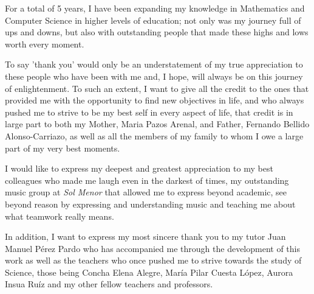 For a total of 5 years, I have been expanding my knowledge in Mathematics and Computer Science in higher levels of education; not only was my journey full of ups and downs, but also with outstanding people that made these highs and lows worth every moment. 

To say 'thank you' would only be an understatement of my true appreciation to these people who have been with me and, I hope, will always be on this journey of enlightenment. To such an extent, I want to give all the credit to the ones that provided me with the opportunity to find new objectives in life, and who always pushed me to strive to be my best self in every aspect of life, that credit is in large part to both my Mother, Maria Pazos Arenal, and Father, Fernando Bellido Alonso-Carriazo, as well as all the members of my family to whom I owe a large part of my very best moments.

I would like to express my deepest and greatest appreciation to my best colleagues who made me laugh even in the darkest of times, my outstanding music group at \textit{Sol Menor} that allowed me to express beyond academic, see beyond reason by expressing and understanding music and teaching me about what teamwork really means.

In addition, I want to express my most sincere thank you to my tutor Juan Manuel Pérez Pardo who has accompanied me through the development of this work as well as the teachers who once pushed me to strive towards the study of Science, those being Concha Elena Alegre, María Pilar Cuesta López, Aurora Insua Ruíz and my other fellow teachers and professors.
